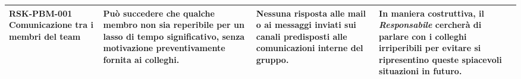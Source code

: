 \begin{center}
\begin{longtable}{|p{3cm}|p{4cm}|p{3.5cm}|p{3.5cm}|}
		\hline
	RSK-PBM-001 \newline Comunicazione tra i membri del team
	 & 
	Può succedere che qualche membro non sia reperibile per un lasso di tempo significativo, senza motivazione preventivamente fornita ai colleghi.
	&   

	Nessuna risposta alle mail o ai messaggi inviati sui canali predisposti alle comunicazioni interne del gruppo.
	 
	& In maniera costruttiva, il \textit{Responsabile}
	   cercherà di parlare con i colleghi irriperibili per evitare si ripresentino queste spiacevoli situazioni in futuro. \\
	\hline
	
	\end{longtable}
\end{center}